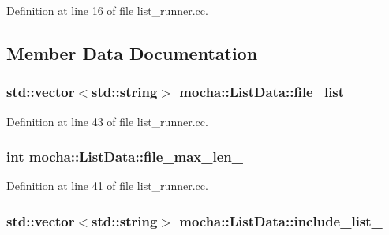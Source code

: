 Definition at line 16 of file list\_\-runner.cc.



\subsection{Member Data Documentation}
\hypertarget{classmocha_1_1_list_data_ad662f7359e651073fd6874c884a82445}{
\subsubsection[{file\_\-list\_\-}]{\setlength{\rightskip}{0pt plus 5cm}std::vector$<$std::string$>$ {\bf mocha::ListData::file\_\-list\_\-}}}
\label{classmocha_1_1_list_data_ad662f7359e651073fd6874c884a82445}


Definition at line 43 of file list\_\-runner.cc.

\hypertarget{classmocha_1_1_list_data_a4053612ff8073fb21f493efd5e2c0211}{
\subsubsection[{file\_\-max\_\-len\_\-}]{\setlength{\rightskip}{0pt plus 5cm}int {\bf mocha::ListData::file\_\-max\_\-len\_\-}}}
\label{classmocha_1_1_list_data_a4053612ff8073fb21f493efd5e2c0211}


Definition at line 41 of file list\_\-runner.cc.

\hypertarget{classmocha_1_1_list_data_ae509490b409f30f671174f2461cd47fd}{
\subsubsection[{include\_\-list\_\-}]{\setlength{\rightskip}{0pt plus 5cm}std::vector$<$std::string$>$ {\bf mocha::ListData::include\_\-list\_\-}}}
\label{classmocha_1_1_list_data_ae509490b409f30f671174f2461cd47fd}



